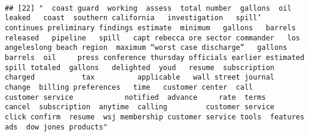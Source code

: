 \documentclass[
]{article}
\begin{document}
\begin{verbatim}
                                                                                                                                                                                                                                                                                                                                                                                                                                                                   
## [22] "  coast guard  working  assess  total number  gallons  oil leaked   coast  southern california   investigation   spill’  continues preliminary findings estimate  minimum   gallons   barrels  released   pipeline   spill   capt rebecca ore sector commander   los angeleslong beach region  maximum “worst case discharge”   gallons   barrels  oil     press conference thursday officials earlier estimated  spill totaled  gallons   delighted  youd   resume  subscription    charged           tax          applicable   wall street journal           change  billing preferences   time   customer center  call         customer service            notified  advance     rate  terms           cancel  subscription  anytime  calling         customer service         click confirm  resume  wsj membership customer service tools  features ads  dow jones products"                                                                                                                                                                                                                                                                                                                                                                                                                                                                                                                                                                                                                                                                                                                                                                                                                                                                                                                                                                                                                                                                                                                                                                                                                                                                                                                                                                                                                                                                                                                                                                                                                                                                                                                                                                                                                                                                                                                                                                                                                                                                                         
\end{verbatim}
\end{document}
